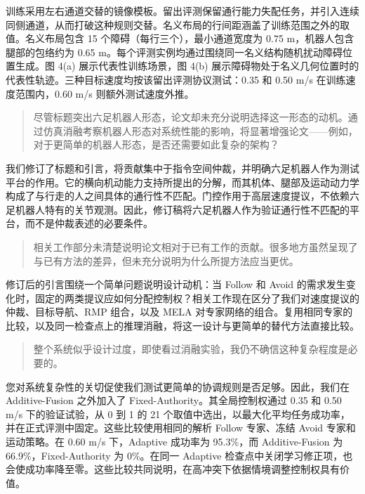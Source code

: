 训练采用左右通道交替的镜像模板。留出评测保留通行能力失配任务，并引入连续同侧通道，从而打破这种规则交替。名义布局的行间距涵盖了训练范围之外的取值。名义布局包含 15 个障碍（每行三个），最小通道宽度为 0.75 m，机器人包含腿部的包络约为 0.65 m。每个评测实例均通过围绕同一名义结构随机扰动障碍位置生成。图 4(a) 展示代表性训练场景，图 4(b) 展示障碍物处于名义几何位置时的代表性轨迹。三种目标速度均按该留出评测协议测试：0.35 和 0.50 m/s 在训练速度范围内，0.60 m/s 则额外测试速度外推。

\begin{quote}
尽管标题突出六足机器人形态，论文却未充分说明选择这一形态的动机。通过仿真消融考察机器人形态对系统性能的影响，将显著增强论文——例如，对于更简单的机器人形态，是否还需要如此复杂的架构？
\end{quote}
\response
我们修订了标题和引言，将贡献集中于指令空间仲裁，并明确六足机器人作为测试平台的作用。它的横向机动能力支持所提出的分解，而其机体、腿部及运动动力学构成了与行走的人之间具体的通行性不匹配。门控作用于高层速度提议，不依赖六足机器人特有的关节观测。因此，修订稿将六足机器人作为验证通行性不匹配的平台，而不是仲裁表述的必要条件。

\begin{quote}
相关工作部分未清楚说明论文相对于已有工作的贡献。很多地方虽然呈现了与已有方法的差异，但未充分说明为什么所提方法应当更优。
\end{quote}
\response
修订后的引言围绕一个简单问题说明设计动机：当 Follow 和 Avoid 的需求发生变化时，固定的两类提议应如何分配控制权？相关工作现在区分了我们对速度提议的仲裁、目标导航、RMP 组合，以及 MELA 对专家网络的组合。复用相同专家的比较，以及同一检查点上的推理消融，将这一设计与更简单的替代方法直接比较。

\begin{quote}
整个系统似乎设计过度，即使看过消融实验，我仍不确信这种复杂程度是必要的。
\end{quote}
\response
您对系统复杂性的关切促使我们测试更简单的协调规则是否足够。因此，我们在 Additive-Fusion 之外加入了 Fixed-Authority。其全局控制权通过 0.35 和 0.50 m/s 下的验证试验，从 0 到 1 的 21 个取值中选出，以最大化平均任务成功率，并在正式评测中固定。这些比较使用相同的解析 Follow 专家、冻结 Avoid 专家和运动策略。在 0.60 m/s 下，Adaptive 成功率为 95.3\%，而 Additive-Fusion 为 66.9\%，Fixed-Authority 为 0\%。在同一 Adaptive 检查点中关闭学习修正项，也会使成功率降至零。这些比较共同说明，在高冲突下依据情境调整控制权具有价值。

